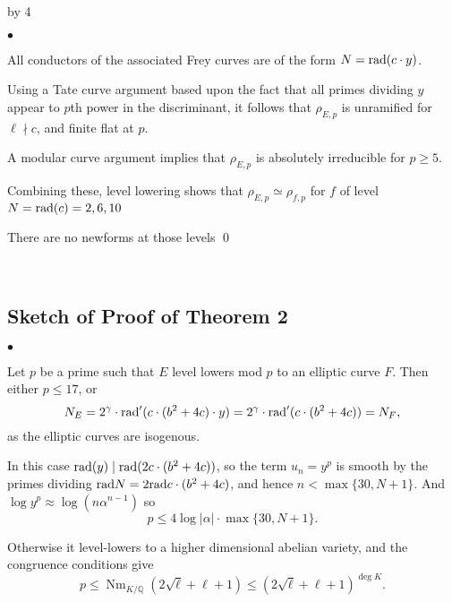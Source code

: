 \documentclass[12pt]{scrartcl}
\newenvironment{citemize}{
\begin{list}{$\bullet$}{\setlength{\itemsep}{0pt} \setlength{\rightmargin}{0pt} \setlength{\leftmargin}{0.5\labelwidth} \setlength{\topsep}{0pt}}
}{\end{list}}
\def\Q{{\mathbb Q}}
\newcommand{\rad}{{\rm{rad}}}
\newcommand{\notdiv}{\nmid}
\newcommand{\Nm}{\operatorname{Nm}}
\def\anzspalten{4}
\newlength{\kastenwidth}
\newenvironment{kasten}{%
  \begin{lrbox}{\dummybox}%
    \begin{minipage}{0.96\linewidth}}%
    {\end{minipage}%
  \end{lrbox}%
  \raisebox{-\depth}{\psshadowbox[framesep=1em]{\usebox{\dummybox}}}\\[0.5em]}
\newenvironment{spalte}{%
  \setlength\kastenwidth{1.2\textwidth}
  \divide\kastenwidth by \anzspalten
  \begin{minipage}[t]{\kastenwidth}}{\end{minipage}\hfill}
\begin{document}
\begin{lrbox}{\spalten}
{\begin{spalte}
\begin{kasten}
\begin{citemize}
\item All conductors of the associated Frey curves are of the form $N = \rad(c \cdot y)$.

\item Using a Tate curve argument based upon the fact that all primes dividing $y$ appear to $p$th power in the discriminant, it follows that $\rho_{E,p}$ is unramified for $\ell \notdiv c$, and finite flat at $p$.

\item A modular curve argument implies that $\rho_{E,p}$ is absolutely irreducible for $p \geq 5$.

\item Combining these, level lowering shows that $\rho_{E,p} \simeq \rho_{f,p}$ for $f$ of level $N = \rad(c) = 2,6,10$

\item There are no newforms at those levels \qed

\end{citemize}

\end{kasten}

\begin{kasten}

\subsection*{\color{blue} Sketch of Proof of Theorem 2}

\begin{citemize}

\item Let $p$ be a prime such that $E$ level lowers mod $p$ to an elliptic curve $F$.  Then either $p \leq 17$, or
\[ N_E = 2^\gamma \cdot \rad'(c \cdot (b^2+4c)\cdot y) = 2^\gamma \cdot \rad'(c \cdot (b^2+4c)) = N_F, \]
as the elliptic curves are isogenous.

\item In this case $\rad(y) \mid \rad(2c \cdot (b^2+4c))$, so the term $u_n = y^p$ is smooth by the primes dividing $\rad{N} = 2\rad{c\cdot (b^2+4c)}$, and hence $n < \max\{30, N+1\}$.  And $\log y^p \approx \log(n \alpha^{n-1})$ so
\[p \leq 4 \log |\alpha| \cdot \max\{30, N+1\}. \]

\item Otherwise it level-lowers to a higher dimensional abelian variety, and the congruence conditions give
\[ p \leq \Nm_{K/\Q}(2\sqrt{\ell} +\ell+1) \leq (2\sqrt{\ell} +\ell+1)^{\operatorname{deg}{K}}.\]


\end{citemize}
\end{kasten}
\end{spalte}}
\end{lrbox}
\end{document}

